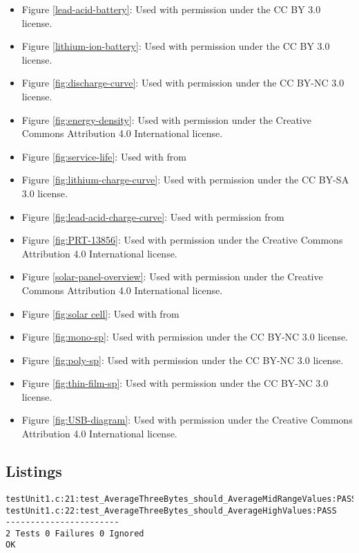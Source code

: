 \begin{itemize}
\item Figure \ref{lead-acid-battery}: Used with permission under the CC BY 3.0 license. \cite{lead-acid-battery}
\item Figure \ref{lithium-ion-battery}: Used with permission under the CC BY 3.0 license. \cite{lithium-ion-battery}
\item Figure \ref{fig:discharge-curve}: Used with permission under the CC BY-NC 3.0 license. \cite{discharge-curve}
\item Figure \ref{fig:energy-density}: Used with permission under the Creative Commons Attribution 4.0 International license. \cite{energy-density}
\item Figure \ref{fig:service-life}: Used with from
\item Figure \ref{fig:lithium-charge-curve}: Used with permission under the CC BY-SA 3.0 license. \cite{lithium-charge-curve}
\item Figure \ref{fig:lead-acid-charge-curve}: Used with permission from
\item Figure \ref{fig:PRT-13856}: Used with permission under the Creative Commons Attribution 4.0 International license. \cite{PRT-13856}
\item Figure \ref{solar-panel-overview}: Used with permission under the Creative Commons Attribution 4.0 International license. \cite{solar-panel-overview}
\item Figure \ref{fig:solar cell}: Used with from
\item Figure \ref{fig:mono-sp}: Used with permission under the CC BY-NC 3.0 license. \cite{mono-sp}
\item Figure \ref{fig:poly-sp}: Used with permission under the CC BY-NC 3.0 license. \cite{poly-sp}
\item Figure \ref{fig:thin-film-sp}: Used with permission under the CC BY-NC 3.0 license. \cite{thin-film-sp}
\item Figure \ref{fig:USB-diagram}: Used with permission under the Creative Commons Attribution 4.0 International license. \cite{USB-diagram}

\end{itemize}

\newpage
\subsection{Listings}
\renewcommand{\lstlistlistingname}{}
\lstlistoflistings
\hfill

\begin{lstlisting}[label={lst:unity-report}, caption=Example Unity Test Report Output \cite{unity-homepage}]
testUnit1.c:21:test_AverageThreeBytes_should_AverageMidRangeValues:PASS
testUnit1.c:22:test_AverageThreeBytes_should_AverageHighValues:PASS
-----------------------
2 Tests 0 Failures 0 Ignored
OK
\end{lstlisting}

